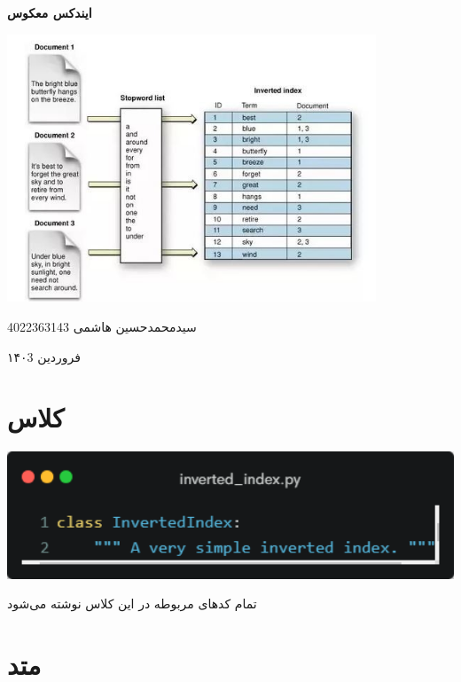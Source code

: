 \documentclass[12pt, dvipsnames, svgnames, x11names,]{article}
\begin{document}
	\begin{titlepage}
		\centering
		\vspace{1cm}
		{\Huge {\textbf{ایندکس معکوس }}\par}
		\vspace{15mm}
		\vspace{16mm}
		\includegraphics[width=11cm]{images/c0.jpg} \par
		\vfill \par	\vfill
		\vspace{16mm}
		{\normalsize	سیدمحمدحسین هاشمی  4022363143 \par}
		\vspace{1cm}
		{\large فروردین ۱۴۰3\par}
	\end{titlepage}
	\tableofcontents
	\newpage
	
	
	\section{کلاس }
	
		{\includegraphics[width=14cm]{images/1.png}}
	
		{\normalsize تمام کدهای مربوطه در این کلاس نوشته می‌شود}
	
				
	
	\section{متد }
	
\end{document}
